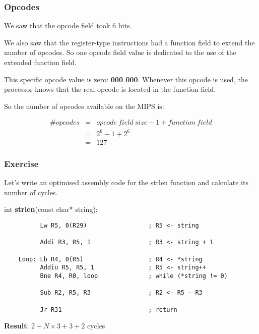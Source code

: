 
\begin{frame}
  \frametitle{Opcodes}

  We saw that the opcode field took 6 bits.

  \-

  We also saw that the register-type instructions had a function field
  to extend the number of opcodes. So one opcode field value is
  dedicated to the use of the extended function field.

  \-

  This specific opcode value is zero: \textbf{000 000}. Whenever this
  opcode is used, the processor knows that the real opcode is located
  in the function field.

  \-

  So the number of opcodes available on the MIPS is:

  \-

  \begin{eqnarray*}
    \# opcodes & = & opcode~field~size - 1 + function~field \\
              & = & 2^{6} - 1 + 2^{6} \\
              & = & 127
  \end{eqnarray*}
\end{frame}

%
%

\begin{frame}[containsverbatim]
  \frametitle{Exercise}

  Let's write an optimised assembly code for the strlen function and
  calculate its number of cycles.

  \-

  int \textbf{strlen}(const char* string);

  \begin{verbatim}
          Lw R5, 0(R29)                 ; R5 <- string

          Addi R3, R5, 1                ; R3 <- string + 1

    Loop: Lb R4, 0(R5)                  ; R4 <- *string
          Addiu R5, R5, 1               ; R5 <- string++
          Bne R4, R0, loop              ; while (*string != 0)

          Sub R2, R5, R3                ; R2 <- R5 - R3

          Jr R31                        ; return
  \end{verbatim}

  \textbf{Result}: $2 + N \times 3 + 3 + 2$ cycles
\end{frame}


